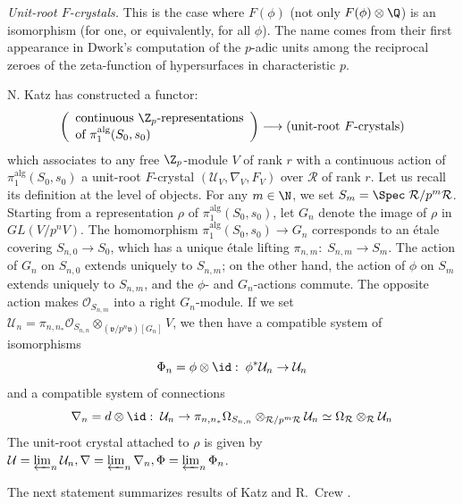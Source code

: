 \begin{para}\label{para-unit-root}
 {\itshape Unit-root $F$-crystals.}  This is the case where $F(\phi)$
 (not only $F(\phi)\otimes {\Q}$) is an isomorphism (for one, or
 equivalently, for all $\phi$).  The name comes from their first
 appearance in Dwork's computation of the $p$-adic units among the
 reciprocal zeroes of the zeta-function of hypersurfaces in
 characteristic $p$.

 N. Katz has constructed a functor:
 \begin{equation*}
  \left(\begin{array}{l}
   \text{continuous ${\Z}_p$-representations}\\
   \text{of $\pi_1^{\mathrm{alg}}(S_0,s_0)$}
  \end{array}\right)
   \longrightarrow \text{(unit-root $F$-crystals)}
 \end{equation*}
 which associates to any free ${\Z}_p$-module $V$ of rank $r$
 with a continuous action of
 $\pi_1^{\mathrm{alg}}(S_0,s_0)$ a unit-root
 $F$-crystal $(\mathcal{U}_V,\nabla_V, F_V)$ over $\mathcal{R}$ of rank
 $r$.
 Let us recall its definition at the level of objects.
 For any $m\in \N$, we set $S_m=\Spec\;\mathcal{R}/p^m\mathcal{R}$.
 Starting from a representation $\rho$ of $\pi_1^{\mathrm{alg}}(S_0,s_0)$, let
 $G_n$ denote the image of $\rho$ in $GL(V/p^nV)$.  The homomorphism
 $\pi_1^{\mathrm{alg}}(S_0,s_0)\rightarrow G_n$ corresponds to an \'etale 
 covering $S_{n,0}\rightarrow S_0$, which has a
 unique \'etale lifting $\pi_{n,m}:\;S_{n,m}\rightarrow S_m$. The action 
 of $G_n$ on $S_{n,0}$ extends uniquely to
 $S_{n,m}$; on the other hand, the action of $\phi$ on $S_m$ extends 
 uniquely to $S_{n,m}$, and the $\phi$- and
 $G_n$-actions commute. The opposite action makes
 $\mathcal{O}_{S_{n,m}}$ into a right $G_n$-module.
 If we set $\mathcal{U}_n=
 \pi_{n,n_\ast}\mathcal{O}_{S_{n,n}}
 \otimes_{(\mathfrak{v}/p^n\mathfrak{v})[G_n]} V$, 
 we then have a compatible system of isomorphisms
 \begin{equation*}
  \Phi_n=\phi\otimes \id:\;\phi^{\ast}\mathcal{U}_n\rightarrow\mathcal{U}_n
 \end{equation*} 
 and a compatible system of connections
 \begin{equation*}
  \nabla_n=d\otimes \id:\;\mathcal{U}_n\rightarrow
 \pi_{n,n_\ast}\Omega_{S_{n,n}}\otimes_{\mathcal{R}/p^m\mathcal{R}}
 \mathcal{U}_n \simeq \Omega_\mathcal{R}\otimes_\mathcal{R} {\mathcal{U}}_n
 \end{equation*} 
 The unit-root crystal attached to $\rho$ is given 
 by $\mathcal{U}=\varprojlim_n \mathcal{U}_n,
 \nabla=\varprojlim_n \nabla_n,\Phi=\varprojlim_n \Phi_n$.

 The next statement summarizes results of Katz and R.~Crew \cite{fapr}.
\end{para}

